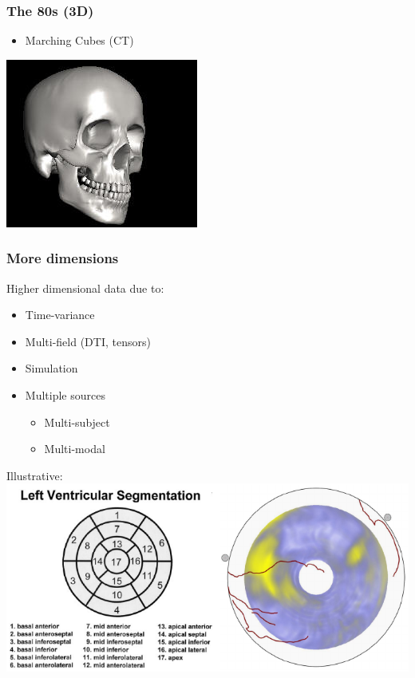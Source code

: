 \documentclass{beamer}
\begin{document}
\begin{frame}
	\frametitle{The 80s (3D)}
	\begin{itemize}
		\item Marching Cubes (CT)
	\end{itemize}
	\begin{center}
		\includegraphics[width=.4\textwidth,height=.4\textheight]{images/marching}
	\end{center}
\end{frame}

\begin{frame}
	\frametitle{More dimensions}
	Higher dimensional data due to:
	\begin{itemize}
		\item Time-variance
		\item Multi-field (DTI, tensors)
		\item Simulation
		\item Multiple sources
			\begin{itemize}
				\item Multi-subject
				\item Multi-modal
			\end{itemize}
	\end{itemize}
\end{frame}

\begin{frame}
	Illustrative:
	\includegraphics[width=\textwidth]{images/heart}
\end{frame}
\end{document}
